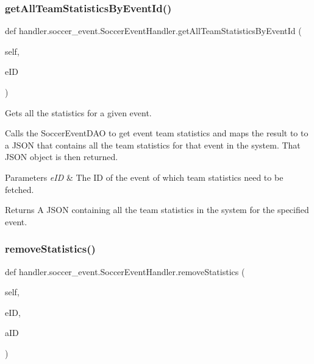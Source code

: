 \subsubsection{\texorpdfstring{get\+All\+Team\+Statistics\+By\+Event\+Id()}{getAllTeamStatisticsByEventId()}}
{\footnotesize\ttfamily def handler.\+soccer\+\_\+event.\+Soccer\+Event\+Handler.\+get\+All\+Team\+Statistics\+By\+Event\+Id (\begin{DoxyParamCaption}\item[{}]{self,  }\item[{}]{e\+ID }\end{DoxyParamCaption})}



Gets all the statistics for a given event. 

Calls the Soccer\+Event\+D\+AO to get event team statistics and maps the result to to a J\+S\+ON that contains all the team statistics for that event in the system. That J\+S\+ON object is then returned.


\begin{DoxyParams}{Parameters}
{\em e\+ID} & The ID of the event of which team statistics need to be fetched.\\
\hline
\end{DoxyParams}
\begin{DoxyReturn}{Returns}
A J\+S\+ON containing all the team statistics in the system for the specified event. 
\end{DoxyReturn}
\mbox{\label{classhandler_1_1soccer__event_1_1_soccer_event_handler_ae99d308728553e202c1802c7cf9479ee}} 
\subsubsection{\texorpdfstring{remove\+Statistics()}{removeStatistics()}}
{\footnotesize\ttfamily def handler.\+soccer\+\_\+event.\+Soccer\+Event\+Handler.\+remove\+Statistics (\begin{DoxyParamCaption}\item[{}]{self,  }\item[{}]{e\+ID,  }\item[{}]{a\+ID }\end{DoxyParamCaption})}



